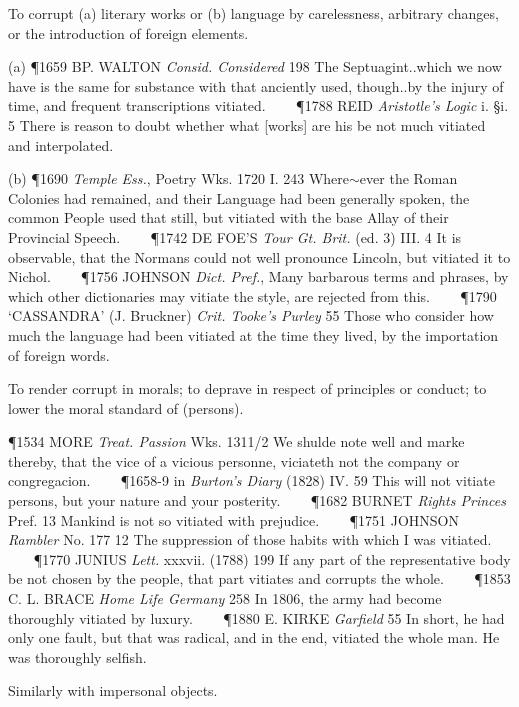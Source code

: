 \begin{description}[wide, labelwidth=!, labelindent=0pt]
\begin{myenumerate}
 To corrupt (a) literary works or (b) language by carelessness, arbitrary changes, or the introduction of foreign elements.

(a) \P 1659 BP. WALTON  \textit{Consid. Considered} 198 The Septuagint..which we now have is the same for substance with that anciently used, though..by the injury of time, and frequent transcriptions vitiated.    
\P 1788 REID  \textit{Aristotle's Logic} i. §i. 5 There is reason to doubt whether what [works] are his be not much vitiated and interpolated.

(b) \P 1690  \textit{Temple Ess.}, Poetry Wks. 1720 I. 243  Where$\sim$ever the Roman Colonies had remained, and their Language had been generally spoken, the common People used that still, but vitiated with the base Allay of their Provincial Speech.    
\P 1742 DE FOE'S  \textit{Tour Gt. Brit.} (ed. 3) III. 4 It is observable, that the Normans could not well pronounce Lincoln, but vitiated it to Nichol.    
\P 1756 JOHNSON  \textit{Dict. Pref.}, Many barbarous terms and phrases, by which other dictionaries may vitiate the style, are rejected from this.    
\P 1790 ‘CASSANDRA’  (J. Bruckner) \textit{Crit. Tooke's Purley} 55 Those who consider how much the language had been vitiated at the time they lived, by the importation of foreign words.

 To render corrupt in morals; to deprave in respect of principles or conduct; to lower the moral standard of (persons).

\P 1534 MORE  \textit{Treat. Passion} Wks. 1311/2 We shulde note well and marke thereby, that the vice of a vicious personne, viciateth not the company or congregacion.    
\P 1658-9 in  \textit{Burton's Diary} (1828) IV. 59 This will not vitiate persons, but your nature and your posterity.    
\P 1682 BURNET  \textit{Rights Princes} Pref. 13 Mankind is not so vitiated with prejudice.    
\P 1751 JOHNSON  \textit{Rambler} No. 177 12 The suppression of those habits with which I was vitiated.    
\P 1770 JUNIUS  \textit{Lett.} xxxvii. (1788) 199 If any part of the representative body be not chosen by the people, that part vitiates and corrupts the whole.    
\P 1853 C. L. BRACE  \textit{Home Life Germany} 258 In 1806, the army had become thoroughly vitiated by luxury.    
\P 1880 E. KIRKE  \textit{Garfield} 55 In short, he had only one fault, but that was radical, and in the end, vitiated the whole man. He was thoroughly selfish.

 Similarly with impersonal objects.


\end{myenumerate}
\end{description}
